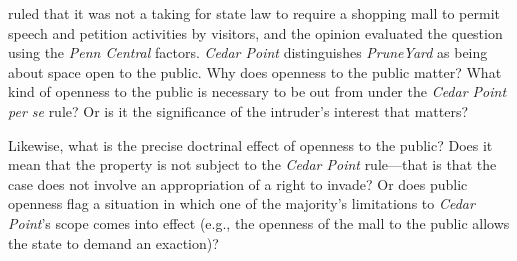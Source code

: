 
ruled that it was not a taking for state law to require a
shopping mall to permit speech and petition activities by visitors, and the
opinion evaluated the question using the \textit{Penn Central} factors.
\textit{Cedar Point} distinguishes \textit{PruneYard} as being about space open
to the public. Why does openness to the public matter? What kind of openness to
the public is necessary to be out from under the \textit{Cedar Point per se}
rule? Or is it the significance of the intruder's interest that matters? 

Likewise, what is the precise doctrinal effect of openness to the
public? Does it mean that the property is not subject to the \textit{Cedar
Point} rule---that is that the case does not involve an appropriation of a right
to invade? Or does public openness flag a situation in which one of the
majority's limitations to \textit{Cedar Point}'s scope comes into effect (e.g.,
the openness of the mall to the public allows the state to demand an exaction)?

